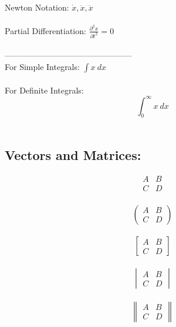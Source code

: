 \documentclass{article}
\begin{document}
	\vspace{2mm} \ \\
  	Newton Notation:
  	$\dot x, \ddot x, \dddot x$ \\

	\vspace{2mm} \ \\
  	Partial Differentiation:
  	$\frac{\partial^2 x}{\partial t^2} = 0$ \\

	\vspace{2mm} \ \\
	-----------------------------------------------
	\vspace{2mm} \ \\
	
	For Simple Integrals:
  	$\int x ~ dx$ \\
	\vspace{1mm} \ \\
  	For Definite Integrals:
  	\[\int^{\infty}_{0} x ~ dx\] \\ 

	\subsection{Vectors and Matrices:}
  	\begin{equation*}
		\begin{matrix}
			A & B \\
			C & D
		\end{matrix}
  	\end{equation*}
  	\vspace{1mm} \ \\
  	\begin{equation*}
		\begin{pmatrix}
			A & B \\
			C & D
		\end{pmatrix}
  	\end{equation*}
  	\vspace{1mm} \ \\
  	\begin{equation*}
		\begin{bmatrix}
			A & B \\
			C & D
		\end{bmatrix}
  	\end{equation*}
  	\vspace{1mm} \ \\
  	\begin{equation*}
		\begin{vmatrix}
			A & B \\
			C & D
		\end{vmatrix}
  	\end{equation*}
  	\vspace{1mm} \ \\
  	\begin{equation*}
		\begin{Vmatrix}
			A & B \\
			C & D
		\end{Vmatrix}
  	\end{equation*}
\end{document}
